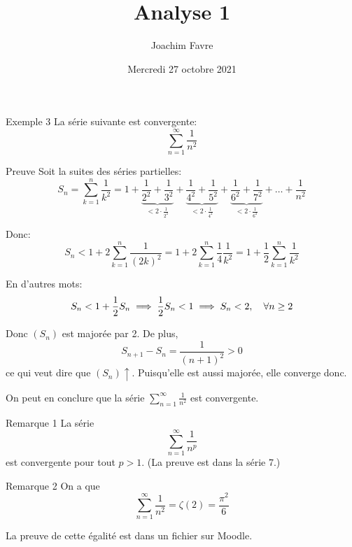 \documentclass[a4paper]{article}
\title{Analyse 1}
\author{Joachim Favre}
\date{Mercredi 27 octobre 2021}
\begin{document}
\maketitle


\begin{parag}{Exemple 3}
    La série suivante est convergente:
    \[\sum_{n=1}^{\infty} \frac{1}{n^2} \]

    \begin{subparag}{Preuve}
        Soit la suites des séries partielles:
        \[S_n = \sum_{k=1}^{n} \frac{1}{k^2} = 1 + \underbrace{\frac{1}{2^2} + \frac{1}{3^2}}_{< 2\cdot \frac{1}{2^2}} + \underbrace{\frac{1}{4^2} + \frac{1}{5^2}}_{< 2\cdot\frac{1}{4^2}} + \underbrace{\frac{1}{6^2} + \frac{1}{7^2}}_{< 2\cdot \frac{1}{6^2}} + \ldots + \frac{1}{n^2}\]

        Donc:
        \[S_n < 1 + 2 \sum_{k = 1}^{n} \frac{1}{\left(2k\right)^2} = 1 + 2 \sum_{k = 1}^{n} \frac{1}{4} \frac{1}{k^2} = 1 + \frac{1}{2} \sum_{k = 1}^{n} \frac{1}{k^2}\]

        En d'autres mots:
        \[S_n < 1 + \frac{1}{2}S_n \implies \frac{1}{2}S_n < 1 \implies S_n < 2, \quad \forall n \geq 2\]

        Donc $\left(S_n\right)$ est majorée par 2. De plus,
        \[S_{n+1} - S_n = \frac{1}{\left(n+1\right)^2} > 0\]
        ce qui veut dire que $\left(S_n\right)\uparrow$. Puisqu'elle est aussi majorée, elle converge donc.

        On peut en conclure que la série $\sum_{n=1}^{\infty} \frac{1}{n^2}$ est convergente.

    \end{subparag}

    \begin{subparag}{Remarque 1}
        La série
        \[\sum_{n=1}^{\infty} \frac{1}{n^{p}}\]
        est convergente pour tout $p > 1$. (La preuve est dans la série 7.)
    \end{subparag}

    \begin{subparag}{Remarque 2}
        On a que
        \[\sum_{n=1}^{\infty} \frac{1}{n^2} = \zeta\left(2\right) = \frac{\pi^2}{6}\]

        La preuve de cette égalité est dans un fichier sur Moodle.
    \end{subparag}
\end{parag}
\end{document}
